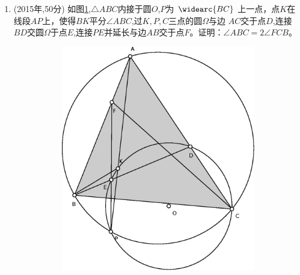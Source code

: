 \documentclass{article}
\begin{document}
\begin{enumerate}
\item (2015年,50分) 如图\ref{fig:China2015},$\triangle ABC$内接于圆$O$,$P$为
$\widearc{BC}$ 上一点，点$K$在线段$AP$上，使得$BK$平分$\angle ABC$,过$K,P,C$三点的圆$\Omega$与边
$AC$交于点$D$,连接$BD$交圆$\Omega$于点$E$,连接$PE$并延长与边$AB$交于点$F$。证明：$\angle ABC=2\angle FCB$。

    \begin{figure}[!ht]
    \centering
    \begin{subfigure}[b]{0.45\textwidth}
    \includegraphics[width=\textwidth]{China2015.eps}
    \caption{}\label{fig:China2015}
    \end{subfigure}~
    \begin{subfigure}[b]{0.45\textwidth}

\end{subfigure}
\end{figure}
\end{enumerate}
\end{document}
